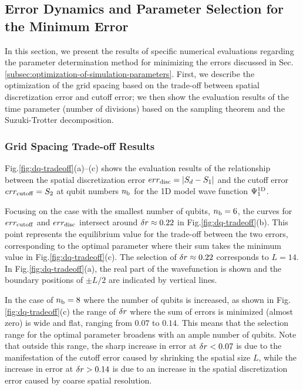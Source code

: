 \documentclass[jctc-draft.tex]{subfiles}
\begin{document}

\subsection{Error Dynamics and Parameter Selection for the Minimum Error}
\label{subsec:parameter-selection-for-minimum-error-results}
In this section, we present the results of specific numerical evaluations
regarding the parameter determination method for minimizing the errors discussed
in Sec. \ref{subsec:optimization-of-simulation-parameters}. First, we describe
the optimization of the grid spacing based on the trade-off between spatial
discretization error and cutoff error; we then show the evaluation results
of the time parameter (number of divisions) based on the sampling theorem and
the Suzuki-Trotter decomposition.

\subsubsection{Grid Spacing Trade-off Results}
\label{subsubsec:delta-r-selection-results}

Fig.\ref{fig:dq-tradeoff}(a)--(c) shows the evaluation results of the
relationship between the spatial discretization error $err_{\mathrm{disc}} = |S_d-S_1|$ and
the cutoff error $err_{\mathrm{cutoff}} = S_2$ at qubit numbers $n_{\mathrm{b}}$ for the 1D model wave
function $\Psi^{\mathrm{1D}}_1$.

Focusing on the case with the smallest number of qubits, $n_{\mathrm{b}}=6$, the curves for
$err_{\mathrm{cutoff}}$ and $err_{\mathrm{disc}}$ intersect around $\delta r \approx 0.22$ in
Fig.\ref{fig:dq-tradeoff}(b). This point represents the equilibrium value for
the trade-off between the two errors, corresponding to the optimal parameter
where their sum takes the minimum value in Fig.\ref{fig:dq-tradeoff}(c). The
selection of $\delta r\approx0.22$ corresponds to $L=14$. In
Fig.\ref{fig:dq-tradeoff}(a), the real part of the wavefunction is shown and the
boundary positions of $\pm L/2$ are indicated by vertical lines.

In the case of $n_{\mathrm{b}}=8$ where the number of qubits is increased, as shown in
Fig.\ref{fig:dq-tradeoff}(c) the range of $\delta r$ where the sum of errors is
minimized (almost zero) is wide and flat, ranging from $0.07$ to $0.14$. This
means that the selection range for the optimal parameter broadens with an ample
number of qubits. Note that outside this range, the sharp increase in error at
$\delta r < 0.07$ is due to the manifestation of the cutoff error caused by
shrinking the spatial size $L$, while the increase in error at $\delta r > 0.14$
is due to an increase in the spatial discretization error caused by coarse spatial
resolution.
\end{document}
